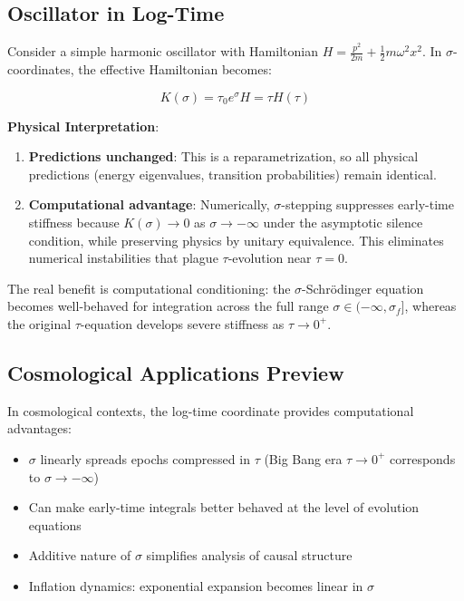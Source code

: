 \documentclass[11pt,a4paper]{article}
\begin{document}
\subsection{Oscillator in Log-Time}

Consider a simple harmonic oscillator with Hamiltonian $H = \frac{p^2}{2m} + \frac{1}{2}m\omega^2 x^2$. In $\sigma$-coordinates, the effective Hamiltonian becomes:

\begin{equation}
K(\sigma) = \tau_0 e^{\sigma} H = \tau H(\tau)
\end{equation}

\textbf{Physical Interpretation}: 
\begin{enumerate}
\item \textbf{Predictions unchanged}: This is a reparametrization, so all physical predictions (energy eigenvalues, transition probabilities) remain identical.
\item \textbf{Computational advantage}: Numerically, $\sigma$-stepping suppresses early-time stiffness because $K(\sigma) \to 0$ as $\sigma \to -\infty$ under the asymptotic silence condition, while preserving physics by unitary equivalence. This eliminates numerical instabilities that plague $\tau$-evolution near $\tau = 0$.
\end{enumerate}

The real benefit is computational conditioning: the $\sigma$-Schrödinger equation becomes well-behaved for integration across the full range $\sigma \in (-\infty, \sigma_f]$, whereas the original $\tau$-equation develops severe stiffness as $\tau \to 0^+$.

\subsection{Cosmological Applications Preview}

In cosmological contexts, the log-time coordinate provides computational advantages:

\begin{itemize}
\item $\sigma$ linearly spreads epochs compressed in $\tau$ (Big Bang era $\tau \to 0^+$ corresponds to $\sigma \to -\infty$)
\item Can make early-time integrals better behaved at the level of evolution equations
\item Additive nature of $\sigma$ simplifies analysis of causal structure
\item Inflation dynamics: exponential expansion becomes linear in $\sigma$
\end{itemize}
\end{document}

